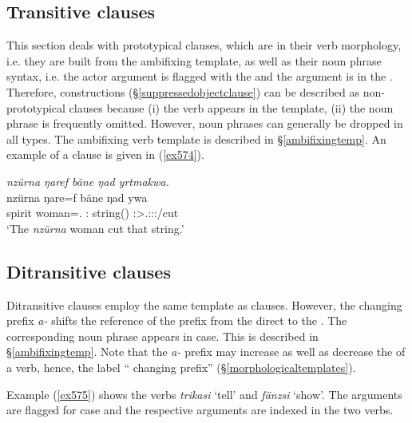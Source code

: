 \subsection{Transitive clauses}\label{transitiveclause}

This section deals with prototypical  clauses, which are  in their verb morphology, i.e. they are built from the ambifixing  template, as well as their noun phrase syntax, i.e. the actor argument is flagged with the  and the  argument is in the . Therefore,  constructions ({\S}\ref{suppressedobjectclause}) can be described as non-prototypical  clauses because (i) the verb appears in the  template, (ii) the  noun phrase is frequently omitted. However, noun phrases can generally be dropped in all  types. The ambifixing verb template is described in {\S}\ref{ambifixingtemp}. An example of a  clause is given in (\ref{ex574}).

\begin{exe}
	\ex \emph{nzürna ŋaref bäne ŋad yrtmakwa.}\\
	\gll nzürna ŋare=f bäne ŋad ywa\\
	spirit woman=\Erg.{\Sg} \Dem:\Med{} string(\Abs) \Sg:\Sbj>\Tsg.\Masc:\Obj:\Pst:\Ipfv/cut\\
	\trans `The \emph{nzürna} woman cut that string.'
	\label{ex574}
\end{exe}

\subsection{Ditransitive clauses}\label{ditransitiveclause}

Ditransitive clauses employ the same template as  clauses. However, the  changing prefix \emph{a-} shifts the reference of the  prefix from the direct  to the . The corresponding noun phrase appears in  case. This is described in {\S}\ref{ambifixingtemp}. Note that the \emph{a-} prefix may increase as well as decrease the  of a verb, hence, the label `` changing prefix'' ({\S}\ref{morphologicaltemplates}).

Example (\ref{ex575}) shows the verbs \emph{trikasi} `tell' and \emph{fänzsi} `show'. The  arguments are flagged for  case and the respective arguments are indexed in the two verbs.

